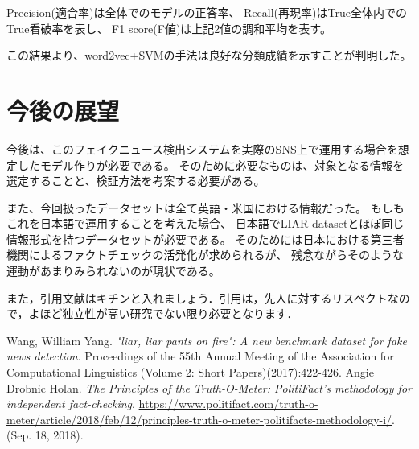 \documentclass[twocolumn, a4paper, uplatex]{UECIEresume}
\begin{document}
Precision(適合率)は全体でのモデルの正答率、
Recall(再現率)はTrue全体内でのTrue看破率を表し、
F1 score(F値)は上記2値の調和平均を表す。

この結果より、word2vec+SVMの手法は良好な分類成績を示すことが判明した。

\section{今後の展望}
今後は、このフェイクニュース検出システムを実際のSNS上で運用する場合を想定したモデル作りが必要である。
そのために必要なものは、対象となる情報を選定することと、検証方法を考案する必要がある。

また、今回扱ったデータセットは全て英語・米国における情報だった。
もしもこれを日本語で運用することを考えた場合、
日本語でLIAR datasetとほぼ同じ情報形式を持つデータセットが必要である。
そのためには日本における第三者機関によるファクトチェックの活発化が求められるが、
残念ながらそのような運動があまりみられないのが現状である。

また，引用文献はキチンと入れましょう\cite{Kinoshita1}．引用は，先人に対するリスペクトなので，よほど独立性が高い研究でない限り必要となります．

{\small
\begin{thebibliography}{*}
  Wang, William Yang. \textit{"liar, liar pants on fire": A new benchmark dataset for fake news detection}. Proceedings of the 55th Annual Meeting of the Association for Computational Linguistics (Volume 2: Short Papers)(2017):422-426.
  Angie Drobnic Holan. \textit{The Principles of the Truth-O-Meter: PolitiFact’s methodology for independent fact-checking}. \url{https://www.politifact.com/truth-o-meter/article/2018/feb/12/principles-truth-o-meter-politifacts-methodology-i/}. (Sep. 18, 2018).
\end{thebibliography}
}
\end{document}
